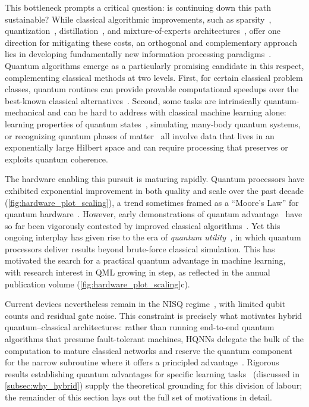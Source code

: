 \documentclass[aps,10pt,groupedaddress,prx,superscriptaddress,twocolumn,balancelastpage, tightenlines]{revtex4-2}
\theoremstyle{plain}  %
\begin{document}
This bottleneck prompts a critical question: is continuing down this path
sustainable? While classical algorithmic improvements, such as
sparsity~\cite{Cheng2024pruning}, quantization~\cite{Gholami2022quantization},
distillation~\cite{Hinton2015distilling}, and mixture-of-experts
architectures~\cite{Cai2024MoESurvey}, offer one direction for mitigating
these costs, an orthogonal and complementary approach lies in developing
fundamentally new information processing
paradigms~\cite{hernandez2020measuring}. Quantum algorithms emerge as a
particularly promising candidate in this respect, complementing
classical methods at two levels. First,
for certain classical problem classes, quantum routines can provide
provable computational speedups over the best-known classical
alternatives~\cite{Biamonte2017QML, liu2021rigorous}. Second, some tasks are intrinsically quantum-mechanical
and can be hard to address with classical machine learning
alone: learning properties of quantum
states~\cite{Huang2022Science}, simulating many-body quantum
systems, or recognizing quantum phases of
matter~\cite{cong2019quantum} all involve data that lives in an
exponentially large Hilbert space and can require processing that
preserves or exploits quantum coherence.





The hardware enabling this pursuit is maturing rapidly. Quantum
processors have exhibited exponential improvement in both quality and
scale over the past decade (\autoref{fig:hardware_plot_scaling}), a
trend sometimes framed as a ``Moore's Law'' for quantum
hardware~\cite{Neven2019law, Cho2021quantum, Google2024Willow}. However, early
demonstrations of quantum advantage~\cite{arute2019quantum,
kim2023evidence, King2025beyond, Google2025echoes} have so far been
vigorously contested by improved classical
algorithms~\cite{huang2020classical, tindall2306efficient,
Begusic2024fast, Mauron2025challenging}. Yet this ongoing interplay
has given rise to the era of \emph{quantum
utility}~\cite{kim2023evidence, IBM_utility}, in which quantum
processors deliver results beyond brute-force classical simulation.
This has motivated the search for a practical quantum advantage in
machine learning, with research interest in \gls{QML} growing in
step, as reflected in the annual publication volume
(\autoref{fig:hardware_plot_scaling}c).

Current devices nevertheless remain in the \gls{NISQ}
regime~\cite{Preskill2018Quantum}, with limited qubit counts and
residual gate noise. This constraint is precisely what motivates
hybrid quantum--classical architectures: rather than running
end-to-end quantum algorithms that presume fault-tolerant machines,
\glspl{HQNN} delegate the bulk of the computation to mature classical
networks and reserve the quantum component for the narrow subroutine
where it offers a principled advantage~\cite{mari2020transfer}.
Rigorous results establishing quantum advantages for specific learning
tasks~\cite{liu2021rigorous, Huang2022Science} (discussed in
\autoref{subsec:why_hybrid}) supply the theoretical grounding for
this division of labour; the remainder of this section lays out the
full set of motivations in detail.
\end{document}
